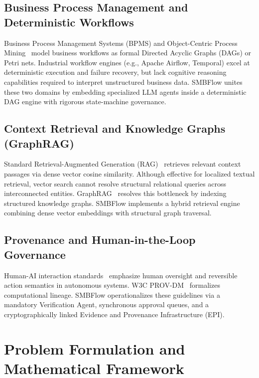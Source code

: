 \documentclass[conference]{IEEEtran}
\begin{document}
\subsection{Business Process Management and Deterministic Workflows}
Business Process Management Systems (BPMS) and Object-Centric Process Mining~\cite{van2019process} model business workflows as formal Directed Acyclic Graphs (DAGs) or Petri nets. Industrial workflow engines (e.g., Apache Airflow, Temporal) excel at deterministic execution and failure recovery, but lack cognitive reasoning capabilities required to interpret unstructured business data. SMBFlow unites these two domains by embedding specialized LLM agents inside a deterministic DAG engine with rigorous state-machine governance.

\subsection{Context Retrieval and Knowledge Graphs (GraphRAG)}
Standard Retrieval-Augmented Generation (RAG)~\cite{lewis2020rag} retrieves relevant context passages via dense vector cosine similarity. Although effective for localized textual retrieval, vector search cannot resolve structural relational queries across interconnected entities. GraphRAG~\cite{edge2024graphrag} resolves this bottleneck by indexing structured knowledge graphs. SMBFlow implements a hybrid retrieval engine combining dense vector embeddings with structural graph traversal.

\subsection{Provenance and Human-in-the-Loop Governance}
Human-AI interaction standards~\cite{amershi2019guidelines} emphasize human oversight and reversible action semantics in autonomous systems. W3C PROV-DM~\cite{groth2012prov} formalizes computational lineage. SMBFlow operationalizes these guidelines via a mandatory Verification Agent, synchronous approval queues, and a cryptographically linked Evidence and Provenance Infrastructure (EPI).

\section{Problem Formulation and Mathematical Framework}
\end{document}
